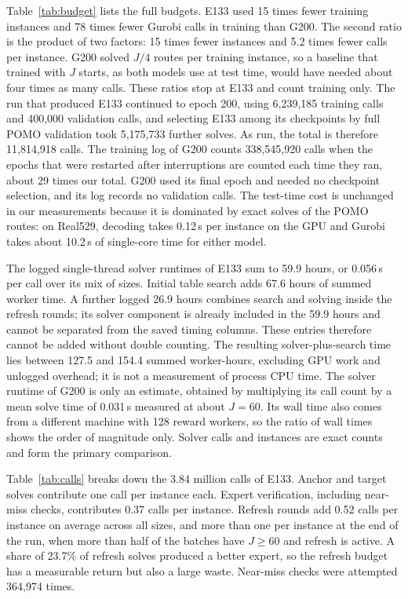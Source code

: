 \documentclass[preprint,12pt,authoryear]{elsarticle}
\begin{document}
Table~\ref{tab:budget} lists the full budgets. E133 used 15 times fewer training instances and 78 times fewer Gurobi calls in training than G200. The second ratio is the product of two factors: 15 times fewer instances and 5.2 times fewer calls per instance. G200 solved $J/4$ routes per training instance, so a baseline that trained with $J$ starts, as both models use at test time, would have needed about four times as many calls. These ratios stop at E133 and count training only. The run that produced E133 continued to epoch 200, using 6,239,185 training calls and 400,000 validation calls, and selecting E133 among its checkpoints by full POMO validation took 5,175,733 further solves. As run, the total is therefore 11,814,918 calls. The training log of G200 counts 338,545,920 calls when the epochs that were restarted after interruptions are counted each time they ran, about 29 times our total. G200 used its final epoch and needed no checkpoint selection, and its log records no validation calls. The test-time cost is unchanged in our measurements because it is dominated by exact solves of the POMO routes: on Real529, decoding takes 0.12\,s per instance on the GPU and Gurobi takes about 10.2\,s of single-core time for either model.

The logged single-thread solver runtimes of E133 sum to 59.9 hours, or 0.056\,s per call over its mix of sizes. Initial table search adds 67.6 hours of summed worker time. A further logged 26.9 hours combines search and solving inside the refresh rounds; its solver component is already included in the 59.9 hours and cannot be separated from the saved timing columns. These entries therefore cannot be added without double counting. The resulting solver-plus-search time lies between 127.5 and 154.4 summed worker-hours, excluding GPU work and unlogged overhead; it is not a measurement of process CPU time. The solver runtime of G200 is only an estimate, obtained by multiplying its call count by a mean solve time of 0.031\,s measured at about $J = 60$. Its wall time also comes from a different machine with 128 reward workers, so the ratio of wall times shows the order of magnitude only. Solver calls and instances are exact counts and form the primary comparison.

Table~\ref{tab:calls} breaks down the 3.84 million calls of E133. Anchor and target solves contribute one call per instance each. Expert verification, including near-miss checks, contributes 0.37 calls per instance. Refresh rounds add 0.52 calls per instance on average across all sizes, and more than one per instance at the end of the run, when more than half of the batches have $J \ge 60$ and refresh is active. A share of 23.7\% of refresh solves produced a better expert, so the refresh budget has a measurable return but also a large waste. Near-miss checks were attempted 364,974 times.
\end{document}
